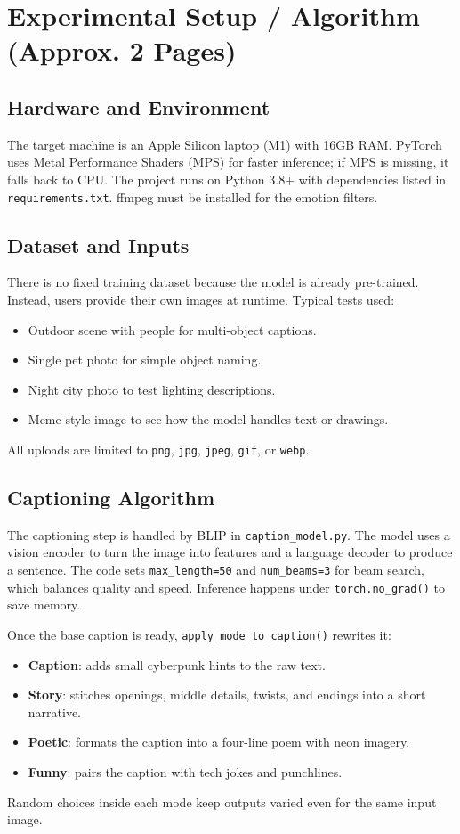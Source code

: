 \documentclass[11pt]{article}
\begin{document}
\section{Experimental Setup / Algorithm (Approx. 2 Pages)}
\subsection{Hardware and Environment}
The target machine is an Apple Silicon laptop (M1) with 16GB RAM. PyTorch uses Metal Performance Shaders (MPS) for faster inference; if MPS is missing, it falls back to CPU. The project runs on Python 3.8+ with dependencies listed in \texttt{requirements.txt}. ffmpeg must be installed for the emotion filters.

\subsection{Dataset and Inputs}
There is no fixed training dataset because the model is already pre-trained. Instead, users provide their own images at runtime. Typical tests used:
\begin{itemize}
    \item Outdoor scene with people for multi-object captions.
    \item Single pet photo for simple object naming.
    \item Night city photo to test lighting descriptions.
    \item Meme-style image to see how the model handles text or drawings.
\end{itemize}
All uploads are limited to \texttt{png}, \texttt{jpg}, \texttt{jpeg}, \texttt{gif}, or \texttt{webp}.

\subsection{Captioning Algorithm}
The captioning step is handled by BLIP in \texttt{caption\_model.py}. The model uses a vision encoder to turn the image into features and a language decoder to produce a sentence. The code sets \texttt{max\_length=50} and \texttt{num\_beams=3} for beam search, which balances quality and speed. Inference happens under \texttt{torch.no\_grad()} to save memory.

Once the base caption is ready, \texttt{apply\_mode\_to\_caption()} rewrites it:
\begin{itemize}
    \item \textbf{Caption}: adds small cyberpunk hints to the raw text.
    \item \textbf{Story}: stitches openings, middle details, twists, and endings into a short narrative.
    \item \textbf{Poetic}: formats the caption into a four-line poem with neon imagery.
    \item \textbf{Funny}: pairs the caption with tech jokes and punchlines.
\end{itemize}
Random choices inside each mode keep outputs varied even for the same input image.
\end{document}
